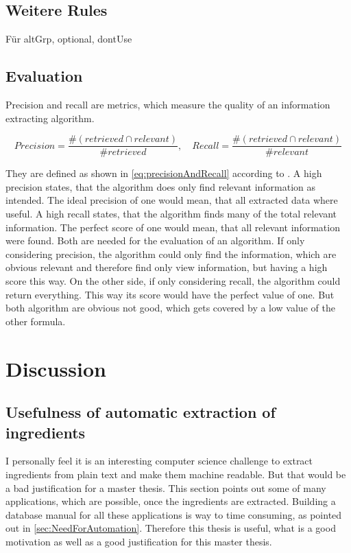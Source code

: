 \documentclass[12pt, twoside]{report}
\begin{document}
\section{Weitere Rules}
Für altGrp, optional, dontUse

\section{Evaluation}
Precision and recall are metrics, which measure the quality of an information extracting algorithm.

\begin{equation} \label{eq:precisionAndRecall}
Precision = \frac{\#(retrieved \cap relevant)}{\#retrieved}, \hspace{1em} Recall = \frac{\#(retrieved \cap relevant)}{\#relevant}
\end{equation}

They are defined as shown in \cref{eq:precisionAndRecall} according to \parencite{surveyOfTextMining}. A high precision states, that the algorithm does only find relevant information as intended. The ideal precision of one would mean, that all extracted data where useful. A high recall states, that the algorithm finds many of the total relevant information. The perfect score of one would mean, that all relevant information were found. Both are needed for the evaluation of an algorithm. If only considering precision, the algorithm could only find the information, which are obvious relevant and therefore find only view information, but having a high score this way. On the other side, if only considering recall, the algorithm could return everything. This way its score would have the perfect value of one. But both algorithm are obvious not good, which gets covered by a low value of the other formula.




\chapter{Discussion}

\section{Usefulness of automatic extraction of ingredients}\label{sec:UsefulnessOfThesis}
I personally feel it is an interesting computer science challenge to extract ingredients from plain text and make them machine readable. But that would be a bad justification for a master thesis. This section points out some of many applications, which are possible, once the ingredients are extracted. Building a database manual for all these applications is way to time consuming, as pointed out in \ref{sec:NeedForAutomation}. Therefore this thesis is useful, what is a good motivation as well as a good justification for this master thesis.
\end{document}
